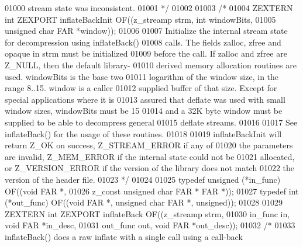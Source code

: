 \begin{DoxyCode}
01000 \textcolor{comment}{   stream state was inconsistent.}
01001 \textcolor{comment}{*/}
01002 
01003 \textcolor{comment}{/*}
01004 \textcolor{comment}{ZEXTERN int ZEXPORT inflateBackInit OF((z\_streamp strm, int windowBits,}
01005 \textcolor{comment}{                                        unsigned char FAR *window));}
01006 \textcolor{comment}{}
01007 \textcolor{comment}{     Initialize the internal stream state for decompression using inflateBack()}
01008 \textcolor{comment}{   calls.  The fields zalloc, zfree and opaque in strm must be initialized}
01009 \textcolor{comment}{   before the call.  If zalloc and zfree are Z\_NULL, then the default library-}
01010 \textcolor{comment}{   derived memory allocation routines are used.  windowBits is the base two}
01011 \textcolor{comment}{   logarithm of the window size, in the range 8..15.  window is a caller}
01012 \textcolor{comment}{   supplied buffer of that size.  Except for special applications where it is}
01013 \textcolor{comment}{   assured that deflate was used with small window sizes, windowBits must be 15}
01014 \textcolor{comment}{   and a 32K byte window must be supplied to be able to decompress general}
01015 \textcolor{comment}{   deflate streams.}
01016 \textcolor{comment}{}
01017 \textcolor{comment}{     See inflateBack() for the usage of these routines.}
01018 \textcolor{comment}{}
01019 \textcolor{comment}{     inflateBackInit will return Z\_OK on success, Z\_STREAM\_ERROR if any of}
01020 \textcolor{comment}{   the parameters are invalid, Z\_MEM\_ERROR if the internal state could not be}
01021 \textcolor{comment}{   allocated, or Z\_VERSION\_ERROR if the version of the library does not match}
01022 \textcolor{comment}{   the version of the header file.}
01023 \textcolor{comment}{*/}
01024 
01025 \textcolor{keyword}{typedef} unsigned (*in\_func) OF((\textcolor{keywordtype}{void} FAR *,
01026                                 z\_const \textcolor{keywordtype}{unsigned} \textcolor{keywordtype}{char} FAR * FAR *));
01027 \textcolor{keyword}{typedef} int (*out\_func) OF((\textcolor{keywordtype}{void} FAR *, \textcolor{keywordtype}{unsigned} \textcolor{keywordtype}{char} FAR *, \textcolor{keywordtype}{unsigned}));
01028 
01029 ZEXTERN \textcolor{keywordtype}{int} ZEXPORT inflateBack OF((z\_streamp strm,
01030                                     in\_func in, \textcolor{keywordtype}{void} FAR *in\_desc,
01031                                     out\_func out, \textcolor{keywordtype}{void} FAR *out\_desc));
01032 \textcolor{comment}{/*}
01033 \textcolor{comment}{     inflateBack() does a raw inflate with a single call using a call-back}

\end{DoxyCode}
